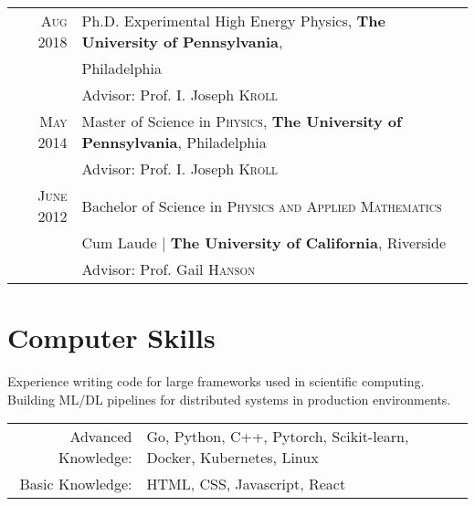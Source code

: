 \documentclass[a4paper,10pt]{article} %
\begin{document}
\begin{tabular}{rl}
\textsc{Aug 2018} & Ph.D. Experimental High Energy Physics, \textbf{The University of Pennsylvania}, \\
                          & Philadelphia \\
&\small Advisor: Prof. I. Joseph \textsc{Kroll}\\
\vspace{1mm}


\textsc{May} 2014 & Master of Science in \textsc{Physics}, \textbf{The University of Pennsylvania}, Philadelphia\\
&\small Advisor: Prof. I. Joseph \textsc{Kroll}\\
\vspace{1mm}


\textsc{June} 2012& Bachelor of Science in \textsc{}\textsc{Physics and Applied Mathematics} \\
&Cum Laude | \normalsize\textbf{The University of California}, Riverside\\
&\small Advisor: Prof. Gail \textsc{Hanson}\\

\end{tabular}
\vspace{0mm}


\section{Computer Skills}

Experience writing code for large frameworks used in scientific computing. Building ML/DL pipelines for distributed systems in production environments.

\begin{tabular}{rl}

Advanced Knowledge: & Go, Python, C++, Pytorch, Scikit-learn, Docker, Kubernetes, Linux  \\
Basic Knowledge: & HTML, CSS, Javascript, React\\  
\end{tabular}
\vspace{1mm}
\end{document}
